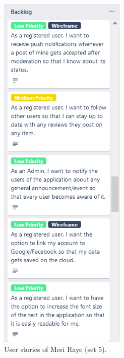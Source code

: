 \documentclass[11pt]{extarticle}
\begin{document}
\begin{center}
    \begin{figure}[H]
        \centering
        \includegraphics[width=2.4in]{Figures/user_stories_5.png}
        \caption{User stories of Meri Raye (set 5).}
    \end{figure}
\end{center}
\end{document}
